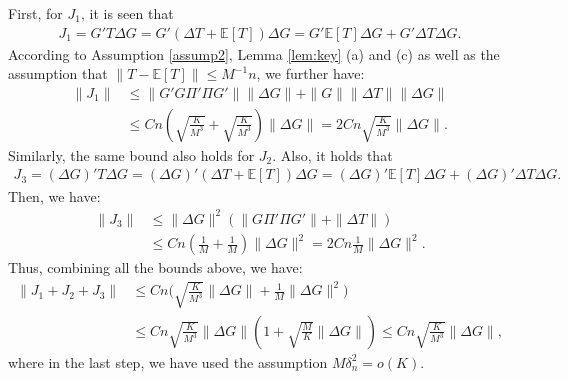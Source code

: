 \documentclass[preprint,11pt]{article}
\newcommand{\mbb}{\mathbb}
\numberwithin{equation}{section}
\begin{document}
First, for $J_1$, it is seen that
\begin{align*}
    J_1=G'T\Delta G=G'(\Delta T+\mbb{E}[T])\Delta G = G'\mbb{E}[T]\Delta G+G'\Delta T \Delta G.
\end{align*}
According to Assumption \ref{assump2}, Lemma \ref{lem:key} (a) and (c) as well as the assumption that $\|T-\mbb{E}[T]\|\leq M^{-1}n$, we further have:
\begin{align*}
   \|J_1\|&\le \|G'G\Pi'\Pi G'\|\|\Delta G\|+\|G\|\|\Delta T\|\|\Delta G\|\\
   &\le Cn\left(\sqrt{\frac{K}{M^3}}+\sqrt{\frac{K}{M^3}}\right)\|\Delta G\|=2Cn\sqrt{\frac{K}{M^3}}\|\Delta G\|.
\end{align*}
Similarly, the same bound also holds for $J_2$. Also, it holds that
\begin{align*}
    J_3=(\Delta G)'T\Delta G = (\Delta G)'(\Delta T+\mbb{E}[T])\Delta G = (\Delta G)'\mbb{E}[T]\Delta G+(\Delta G)'\Delta T\Delta G.
\end{align*}
Then, we have:
\begin{align*}
    \|J_3\|&\le \|\Delta G\|^2\left(\|G\Pi'\Pi G'\|+\|\Delta T\|\right)\\
    &\le Cn\left(\frac{1}{M}+\frac{1}{M}\right)\|\Delta G\|^2=2Cn\frac{1}{M}\|\Delta G\|^2.
\end{align*}
Thus, combining all the bounds above, we have:
\begin{align*}
    \|J_1+J_2+J_3\|
    &\le Cn\Bigg(\sqrt{\frac{K}{M^3}}\|\Delta G\|+\frac{1}{M}\|\Delta G\|^2\Bigg)\\
    &\le Cn\sqrt{\frac{K}{M^3}}\|\Delta G\|\left(1+\sqrt{\frac{M}{K}}\|\Delta G\|\right)\le Cn\sqrt{\frac{K}{M^3}}\|\Delta G\|,
\end{align*}
where in the last step, we have used the assumption $M\delta_n^2=o(K)$.
\end{document}
